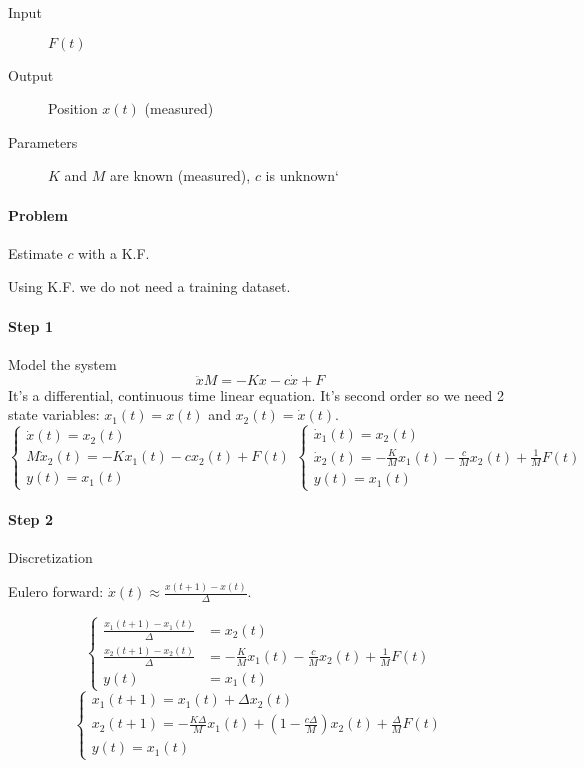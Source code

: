 \begin{example}

    \begin{description}
        \item[Input] $F(t)$
        \item[Output] Position $x(t)$ (measured)
        \item[Parameters] $K$ and $M$ are known (measured), $c$ is unknown`
    \end{description}


    \paragraph{Problem} Estimate $c$ with a K.F.

    Using K.F. we do not need a training dataset.

    \paragraph{Step 1} Model the system
    \[
        \ddot{x}M = -Kx - c\dot{x} + F
    \]
    It's a differential, continuous time linear equation.
    It's second order so we need 2 state variables: $x_1(t) = x(t)$ and $x_2(t) = \dot{x}(t)$.
    \[
        \begin{cases}
            \dot{x}(t) = x_2(t) \\
            M\dot{x}_2(t) = -Kx_1(t) -cx_2(t) + F(t) \\
            y(t) = x_1(t)
        \end{cases}
        \begin{cases}
            \dot{x}_1(t) = x_2(t) \\
            \dot{x}_2(t) = -\frac{K}{M} x_1(t) - \frac{c}{M} x_2(t) + \frac{1}{M}F(t) \\
            y(t) = x_1(t)
        \end{cases}
    \]

    \paragraph{Step 2} Discretization

    Eulero forward: $\dot{x}(t) \approx \frac{x(t+1)-x(t)}{\Delta}$.

    \[
        \begin{cases}
            \frac{x_1(t+1)-x_1(t)}{\Delta} &= x_2(t) \\
            \frac{x_2(t+1)-x_2(t)}{\Delta} &= -\frac{K}{M} x_1(t) - \frac{c}{M} x_2(t) + \frac{1}{M}F(t) \\
            y(t) &= x_1(t)
        \end{cases}
    \]
    \[
        \begin{cases}
            x_1(t+1) = x_1(t) + \Delta x_2(t) \\
            x_2(t+1) = -\frac{K\Delta}{M}x_1(t) + \left(1-\frac{c\Delta}{M}\right)x_2(t) + \frac{\Delta}{M}F(t) \\
            y(t) = x_1(t)
        \end{cases}
    \]


\end{example}

